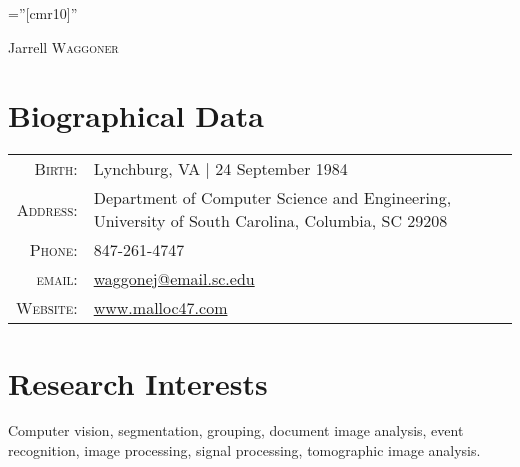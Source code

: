 \documentclass[a4paper,10pt]{article}
\begin{document}

\pagestyle{empty} %

\font\fb=''[cmr10]'' %

\par{\centering
		{\Huge Jarrell \textsc{Waggoner}
	}\bigskip\par}

\section{Biographical Data}

\begin{tabular}{r p{3.5in}}
	\textsc{Birth:} & Lynchburg, VA \hspace{0.5em} | \hspace{0.5em} 24 September 1984 \\
	\textsc{Address:}	& Department of Computer Science and Engineering, University of South Carolina, Columbia, SC 29208 \\
    \textsc{Phone:}     & 847-261-4747\\
    \textsc{email:}     & \href{mailto:waggonej@email.sc.edu}{waggonej@email.sc.edu} \\
	\textsc{Website:}	& \href{http://www.malloc47.com}{www.malloc47.com}
\end{tabular}

\section{Research Interests}

Computer vision, segmentation, grouping, document image analysis, event recognition, image processing, signal processing, tomographic image analysis.
\end{document}
